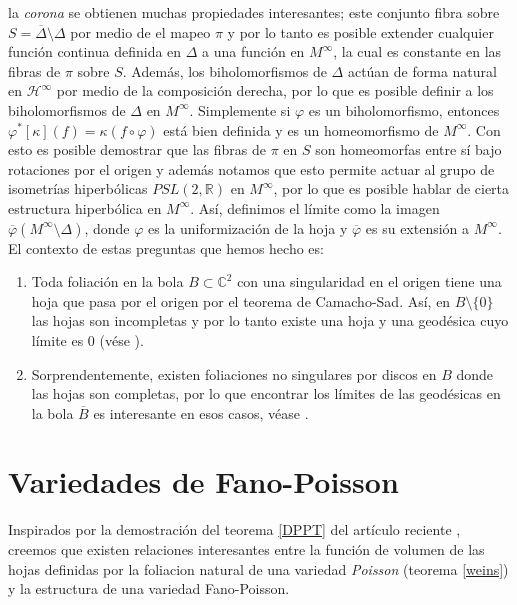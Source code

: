 \documentclass{article}
\newcommand{\co}{\ensuremath{\mathbb C }}
\newcommand{\pslr}{\ensuremath{PSL(2,\mathbb R) }}
\begin{document}
la \emph{corona} se obtienen muchas propiedades interesantes; este conjunto fibra sobre $S=\overline{\Delta}\setminus\Delta$ por medio de el mapeo $\pi$ 
y por lo tanto es posible extender cualquier funci\'on continua definida en $\Delta$ a una funci\'on en $M^{\infty}$, la cual es
constante en las fibras de $\pi$ sobre $S$.
Adem\'as, los biholomorfismos de $\Delta$ act\'uan de forma natural en $\mathcal{H}^{\infty}$ por medio de la composici\'on derecha, por lo que es posible 
definir a los biholomorfismos de $\Delta$ en $M^{\infty}$. Simplemente si $\varphi$ es un biholomorfismo, entonces $\varphi^{*}[\kappa](f)=\kappa(f\circ\varphi)$ est\'a 
bien definida y es un homeomorfismo de $M^{\infty}$. 
Con esto es posible demostrar que las fibras de $\pi$ en $S$ son homeomorfas entre s\'i bajo 
rotaciones por el origen y adem\'as notamos que esto permite actuar al grupo de isometr\'ias hiperb\'olicas $\pslr$ en $M^{\infty}$,
por lo que es posible hablar de cierta estructura hiperb\'olica en $M^{\infty}$. As\'i, definimos el l\'imite como la imagen $\overline{\varphi}(M^{\infty}\setminus\Delta)$, donde $\varphi$ es la uniformizaci\'on
de la hoja y $\overline{\varphi}$ es su extensi\'on a $M^{\infty}$. El contexto de estas preguntas que hemos hecho es: 
\begin{enumerate}
        \item Toda foliaci\'on en la bola $B\subset\co^2$ con una singularidad en el origen tiene una hoja que pasa por el origen
        por el teorema de Camacho-Sad. As\'i, en $B\setminus\{0\}$ las hojas son incompletas y por lo tanto existe una hoja
        y una geod\'esica cuyo l\'imite es $0$ (v\'ese \cite[teorema 3.3]{brunella}).
        \item Sorprendentemente, existen foliaciones no singulares por discos en $B$ donde las hojas son completas, por lo que 
        encontrar los l\'imites de las geod\'esicas en la bola $\overline{B}$ es interesante en esos casos, v\'ease \cite{A-F}.
\end{enumerate}

\section{Variedades de Fano-Poisson}
\noindent  Inspirados por la demostraci\'on del teorema \ref{DPPT} del art\'iculo reciente \cite{DPPT}, creemos que existen 
relaciones interesantes entre la funci\'on de volumen de las hojas definidas por la foliacion natural de una variedad \emph{Poisson}
(teorema \ref{weins}) y la estructura de una variedad Fano-Poisson.
\end{document}
